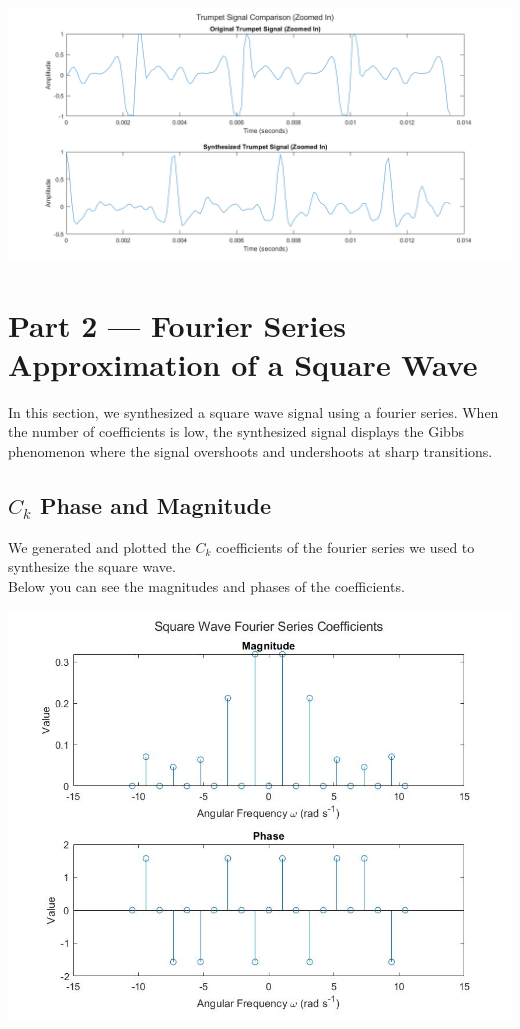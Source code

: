 \documentclass[11pt]{article}
\begin{document}
\includegraphics[width=\textwidth]{trumpet_signal_comparison_(zoomed in).png}


\begin{framed}
	
\end{framed}


\pagebreak
\section{Part 2 --- Fourier Series Approximation of a Square Wave}

In this section, we synthesized a square wave signal using a fourier series.
When the number of coefficients is low, the synthesized signal displays the Gibbs
phenomenon where the signal overshoots and undershoots at sharp transitions.

\subsection{$C_k$ Phase and Magnitude}

We generated and plotted the $C_k$ coefficients of the fourier series
we used to synthesize the square wave.\\

Below you can see the magnitudes and phases of the coefficients.

\includegraphics[width=\textwidth]{ck_values.png}
\end{document}
